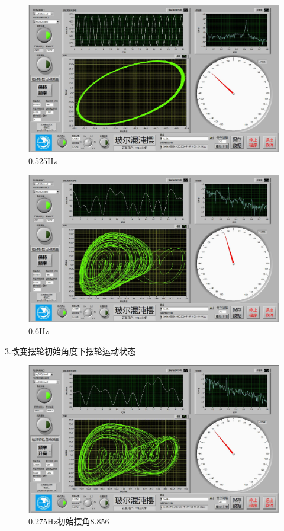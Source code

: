 \documentclass[dvipsnames, svgnames,a4paper,11pt]{article}
\begin{document}
\begin{figure}[H]
	\includegraphics[width=\textwidth]{姚昊廷22322091/0.525Hz加重物.jpg}
	\caption{0.525Hz}
\end{figure}

\begin{figure}[H]
	\includegraphics[width=\textwidth]{姚昊廷22322091/0.3Hz加重物.jpg}
	\caption{0.6Hz}
\end{figure}

3.改变摆轮初始角度下摆轮运动状态
\begin{figure}[H]
	\includegraphics[width=\textwidth]{姚昊廷22322091/0.275Hz8.856.jpg}
	\caption{0.275Hz初始摆角8.856}
\end{figure}
\end{document}
